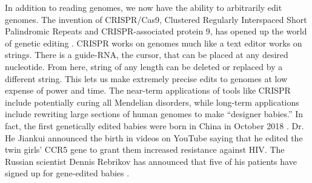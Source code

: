 In addition to reading genomes, we now have the ability to arbitrarily edit genomes.
The invention of CRISPR/Cas9, Clustered Regularly Interspaced Short Palindromic Repeats and CRISPR-associated protein 9, has opened up the world of genetic editing \cite{Zhang2014}.
CRISPR works on genomes much like a text editor works on strings.
There is a guide-RNA, the cursor, that can be placed at any desired nucleotide.
From here, string of any length can be deleted or replaced by a different string.
This lets us make extremely precise edits to genomes at low expense of power and time.
The near-term applications of tools like CRISPR include potentially curing all Mendelian disorders, while long-term applications include rewriting large sections of human genomes to make ``designer babies.''
In fact, the first genetically edited babies were born in China in October 2018 \cite{crisprbabies2018}.
Dr. He Jiankui announced the birth in videos on YouTube saying that he edited the twin girls' CCR5 gene to grant them increased resistance against HIV.
The Russian scientist Dennis Rebrikov has announced that five of his patients have signed up for gene-edited babies \cite{Cohen2019}.
